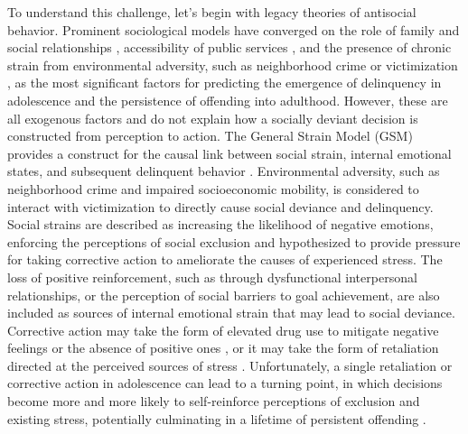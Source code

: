 \documentclass[utf8]{article}
\begin{document}
To understand this challenge, let's begin with legacy theories of antisocial behavior. Prominent sociological models have converged on the role of family and social relationships \citep{tolan1997assessment,henry2001longitudinal}, accessibility of public services \citep{molnar2008effects}, and the presence of chronic strain from environmental adversity, such as neighborhood crime or victimization \citep{gur2019burden}, as the most significant factors for predicting the emergence of delinquency in adolescence and the persistence of offending into adulthood. However, these are all exogenous factors and do not explain how a socially deviant decision is constructed from perception to action. The General Strain Model (GSM) provides a construct for the causal link between social strain, internal emotional states, and subsequent delinquent behavior \citep{agnew2001building,agnew2007pressure}. Environmental adversity, such as neighborhood crime and impaired socioeconomic mobility, is considered to interact with victimization to directly cause social deviance and delinquency. Social strains are described as increasing the likelihood of negative emotions, enforcing the perceptions of social exclusion and hypothesized to provide pressure for taking corrective action to ameliorate the causes of experienced stress. The loss of positive reinforcement, such as through dysfunctional interpersonal relationships, or the perception of social barriers to goal achievement, are also included as sources of internal emotional strain that may lead to social deviance. Corrective action may take the form of elevated drug use to mitigate negative feelings or the absence of positive ones \citep{slocum2010general}, or it may take the form of retaliation directed at the perceived sources of stress \citep{warner2003strain}. Unfortunately, a single retaliation or corrective action in adolescence can lead to a turning point, in which decisions become more and more likely to self-reinforce perceptions of exclusion and existing stress, potentially culminating in a lifetime of persistent offending \citep{laub1993turning}. 
\end{document}

